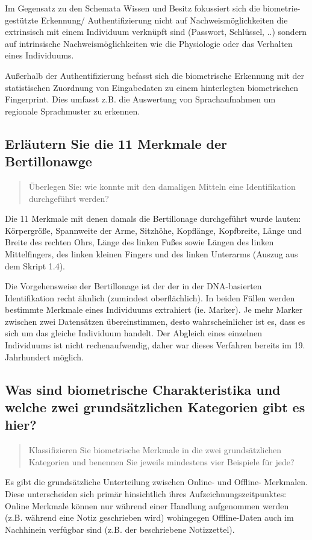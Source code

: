 \documentclass{article}
\newcommand{\annotation}[1]{
\begin{quote}
	\begin{textit}
		{#1}
	\end{textit}
\end{quote}
}
\begin{document}
Im Gegensatz zu den Schemata Wissen und Besitz fokussiert sich die biometrie-gestützte Erkennung/
Authentifizierung nicht auf Nachweismöglichkeiten die extrinsisch mit einem Individuum verknüpft sind 
(Passwort, Schlüssel, ..) sondern auf intrinsische Nachweismöglichkeiten wie die Physiologie oder das
Verhalten eines Individuums.

Außerhalb der Authentifizierung befasst sich die biometrische Erkennung mit der statistischen Zuordnung 
von Eingabedaten zu einem hinterlegten biometrischen Fingerprint. Dies umfasst z.B. die Auswertung von 
Sprachaufnahmen um regionale Sprachmuster zu erkennen.

\subsection{Erläutern Sie die 11 Merkmale der Bertillonawge}
\annotation{{\"U}berlegen Sie: wie konnte mit den damaligen Mitteln eine Identifikation durchgeführt werden?}
Die 11 Merkmale mit denen damals die Bertillonage durchgeführt wurde lauten: Körpergröße, Spannweite der 
Arme, Sitzhöhe, Kopflänge, Kopfbreite, Länge und Breite des rechten Ohrs, Länge des linken Fußes sowie 
Längen des linken Mittelfingers, des linken kleinen Fingers und des linken Unterarms (Auszug aus dem 
Skript 1.4).

Die Vorgehensweise der Bertillonage ist der der in der DNA-basierten Identifikation recht ähnlich (zumindest 
oberflächlich). In beiden Fällen werden bestimmte Merkmale eines Individuums extrahiert (ie. Marker).
Je mehr Marker zwischen zwei Datensätzen übereinstimmen, desto wahrscheinlicher ist es, dass es sich um 
das gleiche Individuum handelt. Der Abgleich eines einzelnen Individuums ist nicht rechenaufwendig, daher 
war dieses Verfahren bereits im 19. Jahrhundert möglich.

\subsection{Was sind biometrische Charakteristika und welche zwei grundsätzlichen Kategorien gibt es hier?}
\annotation{Klassifizieren Sie biometrische Merkmale in die zwei grundsätzlichen Kategorien und benennen Sie jeweils mindestens vier Beispiele für jede?}	
Es gibt die grundsätzliche Unterteilung zwischen Online- und Offline- Merkmalen. Diese unterscheiden sich
primär hinsichtlich ihres Aufzeichnungszeitpunktes: Online Merkmale können nur während einer Handlung 
aufgenommen werden (z.B. während eine Notiz geschrieben wird) wohingegen Offline-Daten auch im Nachhinein
verfügbar sind (z.B. der beschriebene Notizzettel).
\end{document}
